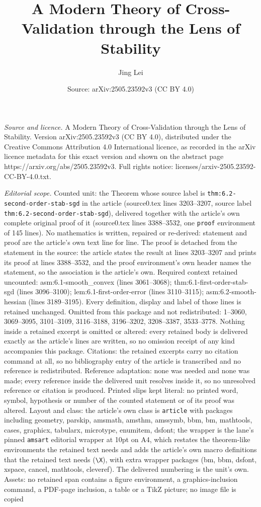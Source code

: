 \documentclass[10pt,a4paper]{amsart}
\title[A Modern Theory of Cross-Validation through the Lens of Stab]{A Modern Theory of Cross-Validation through the Lens of Stability}
\author{Jing Lei}
\date{Source: arXiv:2505.23592v3 (CC BY 4.0)}
\begin{document}
\maketitle

\noindent\emph{Source and licence.} A Modern Theory of Cross-Validation through the Lens of Stability. Version arXiv:2505.23592v3 (CC BY 4.0), distributed under the Creative Commons Attribution 4.0 International licence, as recorded in the arXiv licence metadata for this exact version and shown on the abstract page https://arxiv.org/abs/2505.23592v3. Full rights notice: licenses/arxiv-2505.23592-CC-BY-4.0.txt.\par\smallskip

\noindent\textit{Editorial scope.} Counted unit: the Theorem whose source label is \texttt{thm:6.2-second-order-stab-sgd} in the article (source0.tex lines 3203--3207, source label \texttt{thm:6.2-second-order-stab-sgd}), delivered together with the article's own complete original proof of it (source0.tex lines 3388--3532, one \texttt{proof} environment of 145 lines). No mathematics is written, repaired or re-derived: statement and proof are the article's own text line for line. The proof is detached from the statement in the source: the article states the result at lines 3203--3207 and prints its proof at lines 3388--3532, and the proof environment's own header names the statement, so the association is the article's own. Required context retained uncounted: asm:6.1-smooth\_convex (lines 3061--3068); thm:6.1-first-order-stab-sgd (lines 3096--3100); lem:6.1-first-order-error (lines 3110--3115); asm:6.2-smooth-hessian (lines 3189--3195). Every definition, display and label of those lines is retained unchanged. Omitted from this package and not redistributed: 1--3060, 3069--3095, 3101--3109, 3116--3188, 3196--3202, 3208--3387, 3533--3778. Nothing inside a retained excerpt is omitted or altered: every retained body is delivered exactly as the article's lines are written, so no omission receipt of any kind accompanies this package. Citations: the retained excerpts carry no citation command at all, so no bibliography entry of the article is transcribed and no reference is redistributed. Reference adaptation: none was needed and none was made; every reference inside the delivered unit resolves inside it, so no unresolved reference or citation is produced. Printed slips kept literal: no printed word, symbol, hypothesis or number of the counted statement or of its proof was altered. Layout and class: the article's own class is \texttt{article} with packages including geometry, parskip, amsmath, amsthm, amssymb, bbm, bm, mathtools, cases, graphicx, tabularx, microtype, enumitem, dsfont; the wrapper is the lane's pinned \texttt{amsart} editorial wrapper at 10pt on A4, which restates the theorem-like environments the retained text needs and adds the article's own macro definitions that the retained text needs (\texttt{\textbackslash X}), with extra wrapper packages (bm, bbm, dsfont, xspace, cancel, mathtools, cleveref). The delivered numbering is the unit's own. Assets: no retained span contains a figure environment, a graphics-inclusion command, a PDF-page inclusion, a table or a TikZ picture; no image file is copied 
\end{document}
